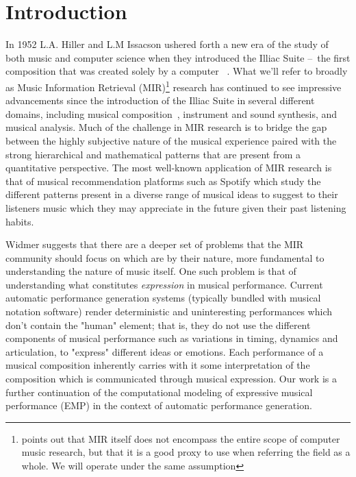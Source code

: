 \chapter{Introduction} \label{ch:introduction}

In 1952 L.A. Hiller and L.M Issacson ushered forth a new era of the study of both music and computer science when they introduced the Illiac Suite – the first composition that was created solely by a computer~\cite{sandred2009revisiting} . What we'll refer to broadly as Music Information Retrieval (MIR)\footnote{\citet{widmer2016getting} points out that MIR itself does not encompass the entire scope of computer music research, but that it is a good proxy to use when referring the field as a whole. We will operate under the same assumption} research has continued to see impressive advancements since the introduction of the Illiac Suite in several different domains, including musical composition~\cite{briot2017deep}, instrument and sound synthesis\cite{engel2017neural}, and musical analysis\cite{widmer2016getting}. Much of the challenge in MIR research is to bridge the gap between the highly subjective nature of the musical experience paired with the strong hierarchical and mathematical patterns that are present from a quantitative perspective. The most well-known application of MIR research is that of musical recommendation platforms such as Spotify which study the different patterns present in a diverse range of musical ideas to suggest to their listeners music which they may appreciate in the future given their past listening habits. 

Widmer\cite{widmer2016getting} suggests that there are a deeper set of problems that the MIR community should focus on which are by their nature, more fundamental to understanding the nature of music itself. One such problem is that of understanding what constitutes \emph{expression} in musical performance. Current automatic performance generation systems (typically bundled with musical notation software) render deterministic and uninteresting performances which don't contain the "human" element; that is, they do not use the different components of musical performance such as variations in timing, dynamics and articulation, to "express" different ideas or emotions. Each performance of a musical composition inherently carries with it some interpretation of the composition which is communicated through musical expression. Our work is a further continuation of the computational modeling of expressive musical performance (EMP) in the context of automatic performance generation. 

